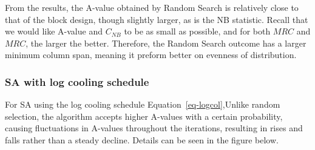 \documentclass[
  a4paper,
  oneside,
  openany,
  12pt,
  onecolumn]{book}
\theoremstyle{plain}
\theoremstyle{definition}
\theoremstyle{remark}
\begin{document}
\begin{figure}


\caption{\label{fig-align}}

\end{figure}%

From the results, the A-value obtained by Random Search is relatively
close to that of the block design, though slightly larger, as is the NB
statistic. Recall that we would like A-value and \(C_{NB}\) to be as
small as possible, and for both \(MRC\) and \(MRC\), the larger the
better. Therefore, the Random Search outcome has a larger minimum column
span, meaning it preform better on evenness of distribution.

\subsubsection{SA with log cooling
schedule}\label{sa-with-log-cooling-schedule}

For SA using the log cooling schedule Equation~\ref{eq-logcol},Unlike
random selection, the algorithm accepts higher A-values with a certain
probability, causing fluctuations in A-values throughout the iterations,
resulting in rises and falls rather than a steady decline. Details can
be seen in the figure below.
\end{document}
